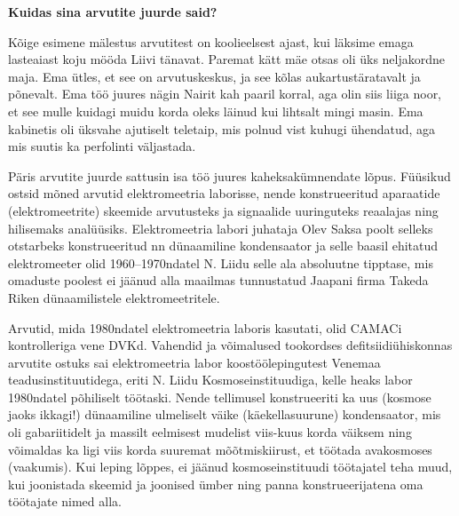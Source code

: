 \label{sisu:mroos}
\textbf{Kuidas sina arvutite juurde said?}

Kõige esimene mälestus arvutitest on koolieelsest ajast, kui
läksime emaga lasteaiast koju mööda Liivi tänavat. Paremat kätt mäe
otsas oli üks neljakordne maja. Ema ütles, et see on arvutuskeskus, ja see
kõlas aukartustäratavalt ja põnevalt. Ema töö juures nägin Nairit kah paaril
korral, aga olin siis liiga noor, et see mulle kuidagi muidu korda oleks
läinud kui lihtsalt mingi masin. Ema kabinetis oli üksvahe ajutiselt teletaip,
mis polnud vist kuhugi ühendatud, aga mis suutis ka perfolinti väljastada.

Päris arvutite juurde sattusin isa töö juures kaheksakümnendate lõpus. Füüsikud
ostsid mõned arvutid elektromeetria laborisse, nende konstrueeritud
aparaatide (elektromeetrite) skeemide arvutusteks ja signaalide uuringuteks reaalajas ning
hilisemaks analüüsiks. Elektromeetria labori juhataja Olev
Saksa poolt selleks otstarbeks konstrueeritud nn
dünaamiline kondensaator ja selle baasil ehitatud elektromeeter olid
1960--1970ndatel N. Liidu selle ala absoluutne tipptase, mis omaduste
poolest ei jäänud alla maailmas tunnustatud Jaapani firma Takeda Riken
dünaamilistele elektromeetritele.

Arvutid, mida 1980ndatel elektromeetria laboris kasutati, olid
CAMACi kontrolleriga vene
DVKd.
Vahendid ja võimalused tookordses defitsiidiühiskonnas arvutite ostuks sai
elektromeetria labor koostöölepingutest Venemaa teadusinstituutidega, eriti N.
Liidu Kosmoseinstituudiga, kelle heaks labor 1980ndatel põhiliselt töötaski.
Nende tellimusel konstrueeriti ka uus (kosmose jaoks ikkagi!) dünaamiline
ulmeliselt väike (käekellasuurune) kondensaator, mis oli gabariitidelt ja
massilt eelmisest mudelist viis-kuus korda väiksem ning võimaldas ka ligi viis korda
suuremat mõõtmiskiirust, et töötada avakosmoses (vaakumis). Kui
leping lõppes, ei jäänud kosmoseinstituudi töötajatel teha muud, kui joonistada
skeemid ja joonised ümber ning panna konstrueerijatena oma töötajate nimed alla.

